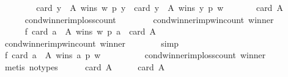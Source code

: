 \begin{isabellebody}
\isamarkupfalse%
\ {\isacharminus}{\kern0pt}\isanewline
\ \ \isamarkupfalse%
\isanewline
\ \ \ \ {\isachardoublequoteopen}card\ {\isacharbraceleft}{\kern0pt}y\ {\isasymin}\ A{\isachardot}{\kern0pt}\ wins\ w\ p\ y{\isacharbraceright}{\kern0pt}\ {\isacharminus}{\kern0pt}\ card\ {\isacharbraceleft}{\kern0pt}y\ {\isasymin}\ A{\isachardot}{\kern0pt}\ wins\ y\ p\ w{\isacharbraceright}{\kern0pt}\ {\isacharequal}{\kern0pt}\isanewline
\ \ \ \ \ \ card\ A\ {\isacharminus}{\kern0pt}\ {}{\isachardoublequoteclose}\isanewline
\ \ \ \ \isamarkupfalse%
\ cond{\isacharunderscore}{\kern0pt}winner{\isacharunderscore}{\kern0pt}imp{\isacharunderscore}{\kern0pt}loss{\isacharunderscore}{\kern0pt}count\isanewline
\ \ \ \ \ \ \ \ cond{\isacharunderscore}{\kern0pt}winner{\isacharunderscore}{\kern0pt}imp{\isacharunderscore}{\kern0pt}win{\isacharunderscore}{\kern0pt}count\ winner\isanewline
\ \ \isamarkupfalse%
\ {\isacharminus}{\kern0pt}\isanewline
\ \ \ \ \isamarkupfalse%
\ f{}{\isacharcolon}{\kern0pt}\ {\isachardoublequoteopen}card\ {\isacharbraceleft}{\kern0pt}a\ {\isasymin}\ A{\isachardot}{\kern0pt}\ wins\ w\ p\ a{\isacharbraceright}{\kern0pt}\ {\isacharequal}{\kern0pt}\ card\ A\ {\isacharminus}{\kern0pt}\ {}{\isachardoublequoteclose}\isanewline
\ \ \ \ \ \ \isamarkupfalse%
\ cond{\isacharunderscore}{\kern0pt}winner{\isacharunderscore}{\kern0pt}imp{\isacharunderscore}{\kern0pt}win{\isacharunderscore}{\kern0pt}count\ winner\isanewline
\ \ \ \ \ \ \isamarkupfalse%
\ simp\isanewline
\ \ \ \ \isamarkupfalse%
\ f{}{\isacharcolon}{\kern0pt}\ {\isachardoublequoteopen}card\ {\isacharbraceleft}{\kern0pt}a\ {\isasymin}\ A{\isachardot}{\kern0pt}\ wins\ a\ p\ w{\isacharbraceright}{\kern0pt}\ {\isacharequal}{\kern0pt}\ {}{\isachardoublequoteclose}\isanewline
\ \ \ \ \ \ \isamarkupfalse%
\ cond{\isacharunderscore}{\kern0pt}winner{\isacharunderscore}{\kern0pt}imp{\isacharunderscore}{\kern0pt}loss{\isacharunderscore}{\kern0pt}count\ winner\isanewline
\ \ \ \ \ \ \isamarkupfalse%
\ {\isacharparenleft}{\kern0pt}metis\ {\isacharparenleft}{\kern0pt}no{\isacharunderscore}{\kern0pt}types{\isacharparenright}{\kern0pt}{\isacharparenright}{\kern0pt}\isanewline
\ \ \ \ \isamarkupfalse%
\ {\isachardoublequoteopen}card\ A\ {\isacharminus}{\kern0pt}\ {}\ {\isacharminus}{\kern0pt}\ {}\ {\isacharequal}{\kern0pt}\ card\ A\ {\isacharminus}{\kern0pt}\ {}{\isachardoublequoteclose}\isanewline

\end{isabellebody}
